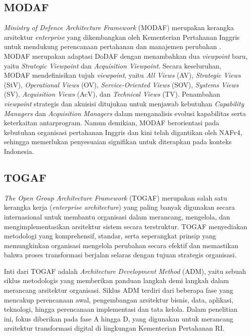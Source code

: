 \subsection{MODAF}
\textit{Ministry of Defence Architecture Framework} (MODAF) merupakan kerangka arsitektur \textit{enterprise} yang dikembangkan oleh Kementerian Pertahanan Inggris untuk mendukung perencanaan pertahanan dan manajemen perubahan \autocite{Weilkiens2022}.
MODAF merupakan adaptasi DoDAF dengan menambahkan dua \textit{viewpoint} baru, yaitu \textit{Strategic Viewpoint} dan \textit{Acquisition Viewpoint}.
Secara keseluruhan, MODAF mendefinisikan tujuh \textit{viewpoint}, yaitu \textit{All Views} (AV), \textit{Strategic Views} (StV), \textit{Operational Views} (OV), \textit{Service-Oriented Views} (SOV), \textit{Systems Views} (SV), \textit{Acquisition Views} (AcV), dan \textit{Technical Views} (TV).
Penambahan \textit{viewpoint} strategis dan akuisisi ditujukan untuk menjawab kebutuhan \textit{Capability Managers} dan \textit{Acquisition Managers} dalam menganalisis evolusi kapabilitas serta keterkaitan antarprogram.
Namun demikian, MODAF berorientasi pada kebutuhan organisasi pertahanan Inggris dan kini telah digantikan oleh NAFv4, sehingga memerlukan penyesuaian signifikan untuk diterapkan pada konteks Indonesia.

\subsection{TOGAF}
\textit{The Open Group Architecture Framework} (TOGAF) \autocite{togaf2020} merupakan salah satu kerangka kerja (\textit{enterprise architecture}) yang paling banyak digunakan secara internasional untuk membantu organisasi dalam merancang, mengelola, dan mengimplementasikan arsitektur sistem secara terstruktur.
TOGAF menyediakan metodologi yang komprehensif, standar, serta seperangkat prinsip yang memungkinkan organisasi mengelola perubahan secara efektif dan memastikan bahwa proses transformasi berjalan selaras dengan tujuan strategis organisasi.

Inti dari TOGAF adalah \textit{Architecture Development Method} (ADM), yaitu sebuah siklus metodologis yang memberikan panduan langkah demi langkah dalam merancang arsitektur organisasi.
Siklus ADM terdiri dari beberapa fase yang mencakup perencanaan awal, pengembangan arsitektur bisnis, data, aplikasi, teknologi, hingga perencanaan implementasi dan tata kelola.
Dalam penelitian ini, fokus diberikan pada fase A hingga D, yang digunakan untuk merancang arsitektur transformasi digital di lingkungan Kementerian Pertahanan RI.

